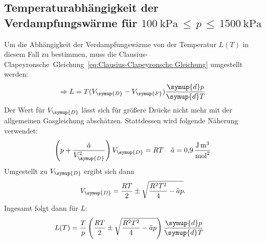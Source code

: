 \subsection{Temperaturabhängigkeit der Verdampfungswärme für $\qty{100}{\kilo\pascal}\,≤\,p\,≤\,\qty{1500}{\kilo\pascal}$}
\label{sec:Auswertung_2}
Um die Abhängigkeit der Verdampfungswärme von der Temperatur $L(T)$ in diesem Fall zu bestimmen, muss die 
Clausius-Clapeyronsche~Gleichung~\eqref{eq:Clausius-Clapeyronsche Gleichung} umgestellt werden:
\begin{align*}
  \Rightarrow L = T(V_{\symup{D}}-V_{\symup{F}})\frac{\symup{d}p}{\symup{d}T}
\end{align*}
Der Wert für $V_{\symup{D}}$ lässt sich für größere Drücke nicht mehr mit der allgemeinen Gasgleichung abschätzen. Stattdessen wird folgende Näherung
verwendet:
\begin{align*}
  \left(p+\frac{\tilde{a}}{V_{\symup{D}}^2}\right)V_{\symup{D}} &= RT  &  \tilde{a} &= \qty{0.9}{\joule\cubic\metre\per\square\mol} \\
\end{align*}
Umgestellt zu $V_{\symup{D}}$ ergibt sich dann
\begin{align*}
  V_{\symup{D}} = \frac{RT}{2}\pm\sqrt{\frac{R^2T^2}{4}-\tilde{a}p}.
\end{align*}
Ingesamt folgt dann für $L$:
\begin{align}
  L(T) &= \frac{T}{p}\left(\frac{RT}{2}\pm\sqrt{\frac{R^2T^2}{4}-\tilde{a}p}\right)\frac{\symup{d}p}{\symup{d}T}
  \label{eq:L(T)}
\end{align}

